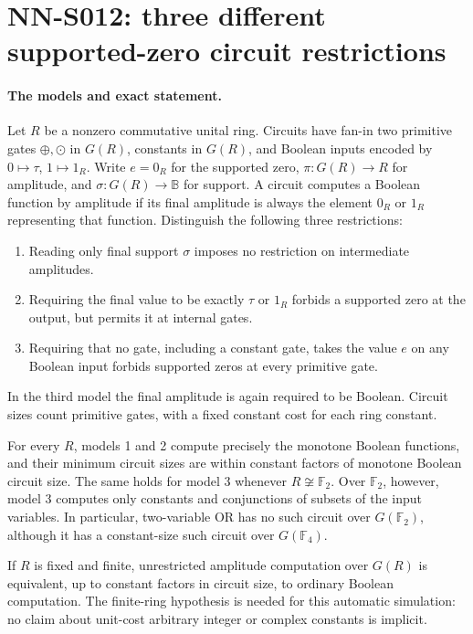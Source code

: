 \section{NN-S012: three different supported-zero circuit restrictions}
\label{sec:root-circuit-models}

\paragraph{The models and exact statement.}
Let $R$ be a nonzero commutative unital ring. Circuits have fan-in two
primitive gates $\oplus,\odot$ in $G(R)$, constants in $G(R)$, and
Boolean inputs encoded by $0\mapsto\tau$, $1\mapsto1_R$.
Write $e=0_R$ for the supported zero, $\pi:G(R)\to R$ for amplitude,
and $\sigma:G(R)\to\mathbb B$ for support. A circuit computes a
Boolean function by amplitude if its final amplitude is always the
element $0_R$ or $1_R$ representing that function. Distinguish the
following three restrictions:
\begin{enumerate}
\item Reading only final support $\sigma$ imposes no restriction on
      intermediate amplitudes.
\item Requiring the final value to be exactly $\tau$ or $1_R$ forbids
      a supported zero at the output, but permits it at internal gates.
\item Requiring that no gate, including a constant gate, takes the
      value $e$ on any Boolean input forbids supported zeros at every
      primitive gate.
\end{enumerate}
In the third model the final amplitude is again required to be Boolean.
Circuit sizes count primitive gates, with a fixed constant cost for each
ring constant.

For every $R$, models 1 and 2 compute precisely the monotone Boolean
functions, and their minimum circuit sizes are within constant factors
of monotone Boolean circuit size. The same holds for model 3 whenever
$R\not\cong\mathbb F_2$. Over $\mathbb F_2$, however, model 3 computes
only constants and conjunctions of subsets of the input variables.
In particular, two-variable OR has no such circuit over $G(\mathbb F_2)$,
although it has a constant-size such circuit over $G(\mathbb F_4)$.

If $R$ is fixed and finite, unrestricted amplitude computation over
$G(R)$ is equivalent, up to constant factors in circuit size, to ordinary
Boolean computation. The finite-ring hypothesis is needed for this
automatic simulation: no claim about unit-cost arbitrary integer or
complex constants is implicit.

